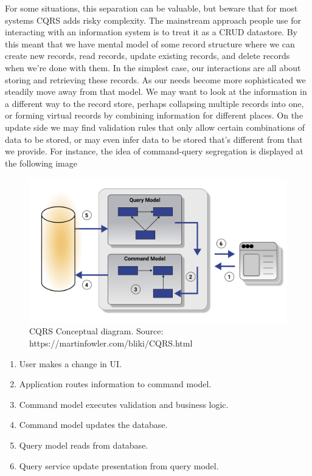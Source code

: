 For some situations, this separation can be valuable, but beware that for most systems CQRS adds risky complexity.
The mainstream approach people use for interacting with an information system is to treat it as a CRUD datastore.
By this meant that we have mental model of some record structure where we can create new records, read records,
update existing records, and delete records when we're done with them.
In the simplest case, our interactions are all about storing and retrieving these records.
As our needs become more sophisticated we steadily move away from that model.
We may want to look at the information in a different way to the record store, perhaps collapsing multiple records into one,
or forming virtual records by combining information for different places.
On the update side we may find validation rules that only allow certain combinations of data to be stored, or may even infer
data to be stored that's different from that we provide.
For instance, the idea of command-query segregation is displayed at the following image

\begin{figure}[H]
    \centering
    \includegraphics[width=1\textwidth]{Pictures/cqrs.pdf}
    \caption{CQRS Conceptual diagram. Source: https://martinfowler.com/bliki/CQRS.html}\label{fig:figure}
\end{figure}

\begin{enumerate}
    \item User makes a change in UI\@.
    \item Application routes information to command model.
    \item Command model executes validation and business logic.
    \item Command model updates the database.
    \item Query model reads from database.
    \item Query service update presentation from query model.
\end{enumerate}

